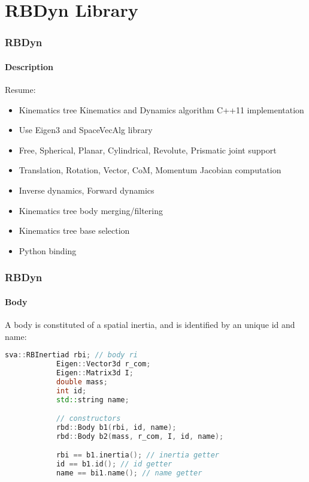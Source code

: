 \documentclass{beamer}
\begin{document}
	\section{RBDyn Library}
  	\begin{frame}
		\frametitle{RBDyn}
		\framesubtitle{Description}
		Resume:
		\begin{itemize}
			\item Kinematics tree Kinematics and Dynamics algorithm C++11 implementation
			\item Use Eigen3 and SpaceVecAlg library
			\item Free, Spherical, Planar, Cylindrical, Revolute, Prismatic joint support
			\item Translation, Rotation, Vector, CoM, Momentum Jacobian computation
			\item Inverse dynamics, Forward dynamics
			\item Kinematics tree body merging/filtering
			\item Kinematics tree base selection
			\item Python binding
		\end{itemize}
	\end{frame}

  	\begin{frame}[fragile]
		\frametitle{RBDyn}
		\framesubtitle{Body}
		A body is constituted of a spatial inertia, and is identified by an unique id and name:
		\begin{lstlisting}[language=C++]
			sva::RBInertiad rbi; // body ri
			Eigen::Vector3d r_com;
			Eigen::Matrix3d I;
			double mass;
			int id;
			std::string name;

			// constructors
			rbd::Body b1(rbi, id, name);
			rbd::Body b2(mass, r_com, I, id, name);

			rbi == b1.inertia(); // inertia getter
			id == b1.id(); // id getter
			name == bi1.name(); // name getter
		\end{lstlisting}
	\end{frame}
\end{document}
